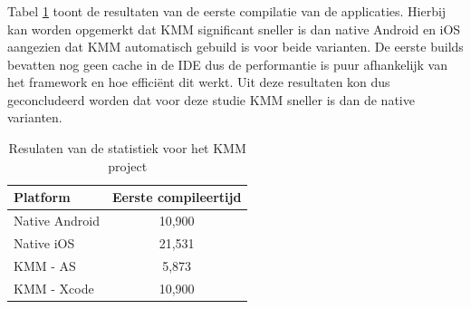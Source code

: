 \subsubsection{}
\label{sec:M-test-1-comp}
Tabel \ref{T:1e-compile} toont de resultaten van de eerste compilatie van de applicaties. Hierbij kan worden opgemerkt dat KMM significant sneller is dan native Android en iOS aangezien dat KMM automatisch gebuild is voor beide varianten. De eerste builds bevatten nog geen cache in de IDE dus de performantie is puur afhankelijk van het framework en hoe efficiënt dit werkt. Uit deze resultaten kon dus geconcludeerd worden dat voor deze studie KMM sneller is dan de native varianten.

\begin{table}[H]
    \centering
    \caption{Resulaten van de statistiek voor het KMM project}
    \begin{tabular}{|l|c|}
        \hline
        {\textbf{Platform}} & {\textbf{Eerste compileertijd}} \\ \hline \hline
        Native Android&10,900\\ \hline
        Native iOS&21,531\\ \hline
        KMM - AS&5,873\\ \hline
        KMM - Xcode &10,900\\ \hline
    \end{tabular}
    \label{T:1e-compile}
\end{table}



\subsubsection{}
\label{sec:M-test-andere-comp}


